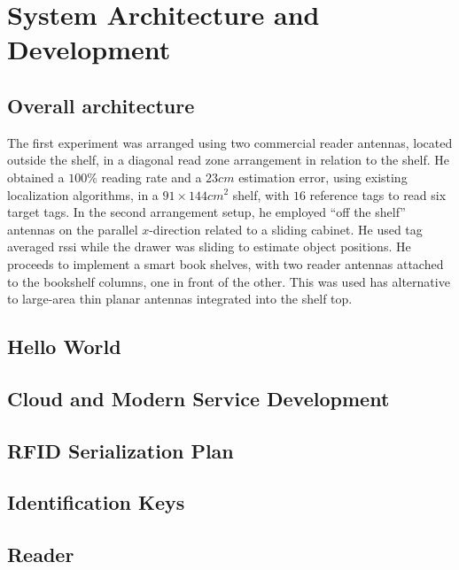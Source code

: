 \chapter{System Architecture and Development} \label{sec:systemdevelopment}

\section{Overall architecture}

 
The first experiment was arranged using two commercial reader antennas, located outside the shelf, in a diagonal read zone arrangement in relation to the shelf. He obtained a $100\%$ reading rate and a $23cm$ estimation error, using existing localization algorithms, in a $91 \times 144cm^2$ shelf, with $16$ reference tags to read six target tags.
In the second arrangement setup, he employed ``off the shelf'' antennas on the parallel $x$-direction related to a sliding cabinet. He used tag averaged \ac{rssi} while the drawer was sliding to estimate object positions.
He proceeds to implement a smart book shelves, with two reader  antennas  attached  to  the  bookshelf  columns,  one  in  front  of  the  other. This was used has alternative to large-area thin planar antennas integrated into the shelf top.

\section{Hello World}

\section{Cloud and Modern Service Development}

\section{RFID Serialization Plan}

\section{Identification Keys}

\section{Reader}


